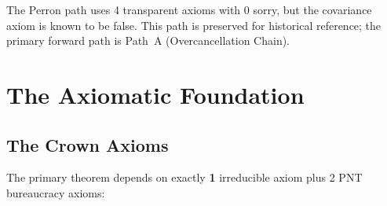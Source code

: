 \documentclass[11pt,a4paper]{article}
\begin{document}
The Perron path uses 4 transparent axioms with 0 sorry, but the
covariance axiom is known to be false. This path is preserved for
historical reference; the primary forward path is Path~A
(Overcancellation Chain).

\section{The Axiomatic Foundation}
\label{sec:axioms}

\subsection{The Crown Axioms}

The primary theorem  depends on
exactly \textbf{1} irreducible axiom plus 2 PNT bureaucracy axioms:
\end{document}
